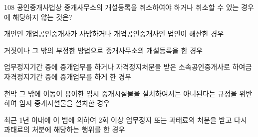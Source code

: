 \begin{question}{108}
공인중개사법상 중개사무소의 개설등록을 취소하여야 하거나 취소할 수 있는 경우에 해당하지 않는 것은?
\begin{choices}
  \item 개인인 개업공인중개사가 사망하거나 개업공인중개사인 법인이 해산한 경우
  \item 거짓이나 그 밖의 부정한 방법으로 중개사무소의 개설등록을 한 경우
  \item 업무정지기간 중에 중개업무를 하거나 자격정지처분을 받은 소속공인중개사로 하여금 자격정지기간 중에 중개업무를 하게 한 경우
  \item 천막 그 밖에 이동이 용이한 임시 중개시설물을 설치하여서는 아니된다는 규정을 위반하여 임시 중개시설물을 설치한 경우
  \item 최근 1년 이내에 이 법에 의하여 2회 이상 업무정지 또는 과태료의 처분을 받고 다시 과태료의 처분에 해당하는 행위를 한 경우
\end{choices}
\end{question}
